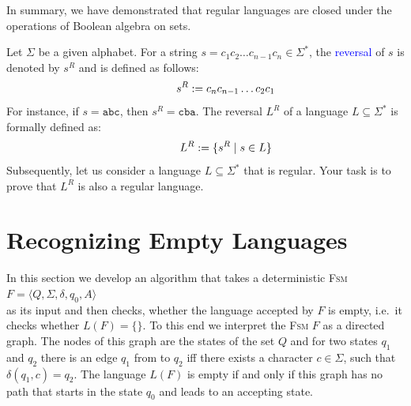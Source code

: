 In summary, we have demonstrated that regular languages are closed under the operations of Boolean algebra on sets.
\pagebreak


\exerciseEng
Let \(\Sigma\) be a given alphabet. For a string \(s = c_1 c_2 \ldots c_{n-1} c_n \in \Sigma^*\), the \textcolor{blue}{reversal}  of \(s\) is denoted by \(s^R\) and is defined as follows:
\[
\hspace*{1.3cm}
s^R := c_n c_{n-1} \ldots c_2 c_1
\]
For instance, if \(s = \mathtt{abc}\), then \(s^R = \mathtt{cba}\). The reversal \(L^R\) of a language \(L \subseteq \Sigma^*\) is formally defined as:
\[
\hspace*{1.3cm}
L^R := \{ s^R \mid s \in L \}
\]
Subsequently, let us consider a language \(L \subseteq \Sigma^*\) that is regular. Your task is to prove that \(L^R\) is also a regular language. \eox


\section{Recognizing Empty Languages \label{section:leer}}
In this section we develop an algorithm that takes a deterministic \textsc{Fsm}
\\[0.2cm]
\hspace*{1.3cm}
$F = \langle Q, \Sigma, \delta, q_0, A \rangle$
\\[0.2cm]
as its input and then checks, whether the language accepted by $F$ is empty, i.e.~it checks whether 
$L(F) = \{\}$.  To this end we interpret the \textsc{Fsm} $F$ as a directed graph.  The nodes of this graph are the
states of the set $Q$ and for two states $q_1$ and
$q_2$ there is an edge  $q_1$ from to $q_2$ iff there exists a character $c \in \Sigma$, such that $\delta(q_1,
c) = q_2$.  
The language $L(F)$ is empty if and only if this graph has no path that starts in the state
$q_0$ and leads to an accepting state.

